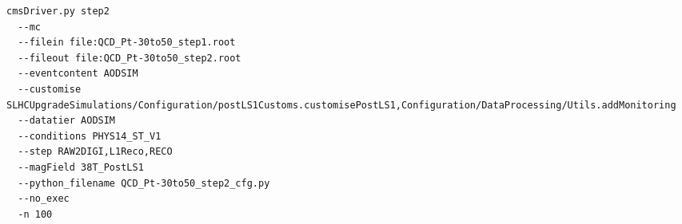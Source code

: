 \documentclass[a4paper]{article}
\begin{document}
\begin{framed}
\begin{lstlisting}
cmsDriver.py step2 
  --mc 
  --filein file:QCD_Pt-30to50_step1.root 
  --fileout file:QCD_Pt-30to50_step2.root 
  --eventcontent AODSIM 
  --customise SLHCUpgradeSimulations/Configuration/postLS1Customs.customisePostLS1,Configuration/DataProcessing/Utils.addMonitoring 
  --datatier AODSIM 
  --conditions PHYS14_ST_V1 
  --step RAW2DIGI,L1Reco,RECO 
  --magField 38T_PostLS1 
  --python_filename QCD_Pt-30to50_step2_cfg.py 
  --no_exec 
  -n 100
\end{lstlisting}
\end{framed}

\newpage
\begin{thebibliography}{10}


\end{thebibliography}
\end{document}

